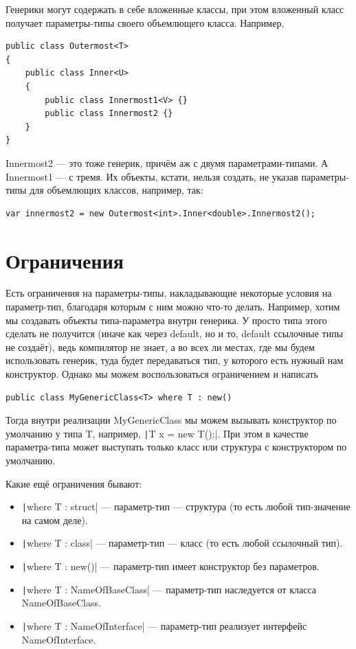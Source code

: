 \documentclass[a5paper]{article}
\begin{document}
Генерики могут содержать в себе вложенные классы, при этом вложенный класс получает параметры-типы своего объемлющего класса. Например,

\begin{verbatim}
public class Outermost<T>
{
    public class Inner<U>
    {
        public class Innermost1<V> {}
        public class Innermost2 {}
    }
}
\end{verbatim}

Innermost2 --- это тоже генерик, причём аж с двумя параметрами-типами. А Innermost1 --- с тремя. Их объекты, кстати, нельзя создать, не указав параметры-типы для объемлющих классов, например, так:

\begin{verbatim}
var innermost2 = new Outermost<int>.Inner<double>.Innermost2();
\end{verbatim}

\section{Ограничения}

Есть ограничения на параметры-типы, накладывающие некоторые условия на параметр-тип, благодаря которым с ним можно что-то делать. Например, хотим мы создавать объекты типа-параметра внутри генерика. У просто типа этого сделать не получится (иначе как через default, но и то, default ссылочные типы не создаёт), ведь компилятор не знает, а во всех ли местах, где мы будем использовать генерик, туда будет передаваться тип, у которого есть нужный нам конструктор. Однако мы можем воспользоваться ограничением и написать

\begin{verbatim}
public class MyGenericClass<T> where T : new()
\end{verbatim}

Тогда внутри реализации MyGenericClass мы можем вызывать конструктор по умолчанию у типа T, например, \texttt|T x = new T();|. При этом в качестве параметра-типа может выступать только класс или структура с конструктором по умолчанию.

Какие ещё ограничения бывают:
\begin{itemize}
    \item \texttt|where T : struct| --- параметр-тип --- структура (то есть любой тип-значение на самом деле).
    \item \texttt|where T : class| --- параметр-тип --- класс (то есть любой ссылочный тип).
    \item \texttt|where T : new()| --- параметр-тип имеет конструктор без параметров.
    \item \texttt|where T : NameOfBaseClass| --- параметр-тип наследуется от класса NameOfBaseClass.
    \item \texttt|where T : NameOfInterface| --- параметр-тип реализует интерфейс NameOfInterface.
\end{itemize}
\end{document}
